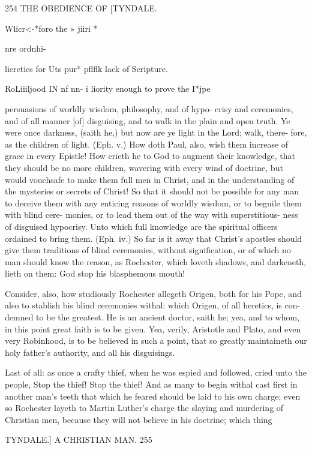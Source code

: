 \documentclass{custom}
\begin{document}
{254
THE OBEDIENCE OF
[TYNDALE.

Wlicr<-*foro 
the » jiiri * 

nre ordnhi- 

lierctics for 
Uts pur* 
pflflk%
lack of 
Scripture. 

RoLiiiljood 
IN nf nn- 
i liority 
enough to 
prove the 
I*jpe 

persuasions of worldly wisdom, philosophy, and of hypo- 
crisy and ceremonies, and of all manner [of] disguising, and 
to walk in the plain and open truth. Ye were once darkness, 
(saith he,) but now are ye light in the Lord; walk, there- 
fore, as the children of light. (Eph. v.) How doth Paul, 
also, wish them increase of grace in every Epistle! How 
crieth he to God to augment their knowledge, that they 
should be no more children, wavering with every wind of 
doctrine, but would vouchsafe to make them full men in 
Christ, and in the understanding of the mysteries or 
secrets of Christ! So that it should not be possible for 
any man to deceive them with any enticing reasons of 
worldly wisdom, or to beguile them with blind cere- 
monies, or to lead them out of the way with superstitious- 
ness of disguised hypocrisy. Unto which full knowledge 
are the spiritual officers ordained to bring them. (Eph. iv.) 
So far is it away that Christ's apostles should give them 
traditions of blind ceremonies, without signification, or of 
which no man should know the reason, as Rochester, 
which loveth shadows, and darkeneth, lieth on them: God 
stop his blasphemous mouth! 

Consider, also, how studiously Rochester allegeth 
Origen, both for his Pope, and also to stablish bis blind 
ceremonies withal: which Origen, of all heretics, is con- 
demned to be the greatest. He is an ancient doctor, 
saith he; yea, and to whom, in this point great faith is to 
be given. Yea, verily, Aristotle and Plato, and even very 
Robinhood, is to be believed in such a point, that so 
greatly maintaineth our holy father's authority, and all his 
disguisings. 

Last of all: as once a crafty thief, when he was espied 
and followed, cried unto the people, Stop the thief! Stop 
the thief! And as many to begin withal cast first in another 
man's teeth that which he feared should be laid to his own 
charge; even so Rochester layeth to Martin Luther's 
charge the slaying and murdering of Christian men, 
because they will not believe in his doctrine; which thing 


TYNDALE.]
A CHRISTIAN MAN.
255

}
\end{document}
